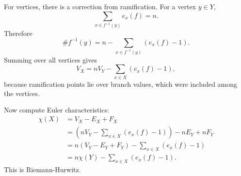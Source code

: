 \documentclass[11pt]{article}
\begin{document}
For vertices, there is a correction from ramification. For a vertex $y\in Y$,
\[
 \sum_{x\in f^{-1}(y)}e_x(f)=n.
\]
Therefore
\[
 \# f^{-1}(y)
 =
 n-\sum_{x\in f^{-1}(y)}(e_x(f)-1).
\]
Summing over all vertices gives
\[
 V_X=nV_Y-\sum_{x\in X}(e_x(f)-1),
\]
because ramification points lie over branch values, which were included among the vertices.

Now compute Euler characteristics:
\[
\begin{aligned}
 \chi(X)
 &=V_X-E_X+F_X\\
 &=
 \left(nV_Y-\sum_{x\in X}(e_x(f)-1)\right)-nE_Y+nF_Y\\
 &=n(V_Y-E_Y+F_Y)-\sum_{x\in X}(e_x(f)-1)\\
 &=n\chi(Y)-\sum_{x\in X}(e_x(f)-1).
\end{aligned}
\]
This is Riemann-Hurwitz.
\end{document}
